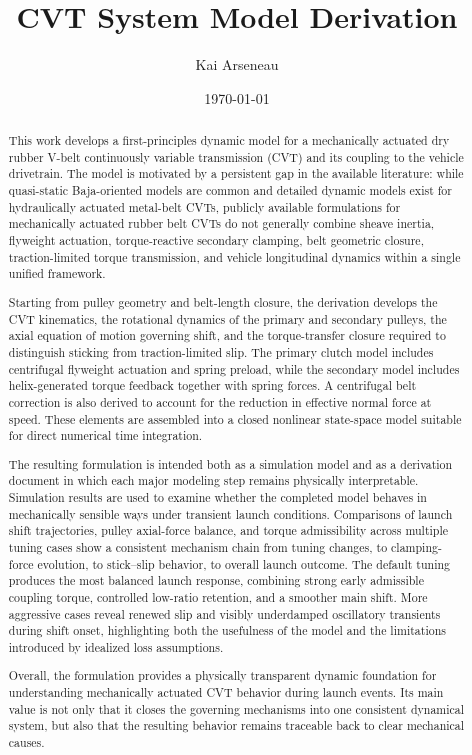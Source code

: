 \documentclass[11pt]{article}
\title{CVT System Model Derivation}
\author{Kai Arseneau}
\date{\today}
\numberwithin{equation}{section}
\newcounter{assump}
\begin{document}
\maketitle
\thispagestyle{empty}

\begin{abstract}
This work develops a first-principles dynamic model for a mechanically
actuated dry rubber V-belt continuously variable transmission (CVT) and its
coupling to the vehicle drivetrain. The model is motivated by a persistent gap
in the available literature: while quasi-static Baja-oriented models are common
and detailed dynamic models exist for hydraulically actuated metal-belt CVTs,
publicly available formulations for mechanically actuated rubber belt CVTs do
not generally combine sheave inertia, flyweight actuation, torque-reactive
secondary clamping, belt geometric closure, traction-limited torque
transmission, and vehicle longitudinal dynamics within a single unified
framework.

Starting from pulley geometry and belt-length closure, the derivation develops
the CVT kinematics, the rotational dynamics of the primary and secondary
pulleys, the axial equation of motion governing shift, and the torque-transfer
closure required to distinguish sticking from traction-limited slip. The
primary clutch model includes centrifugal flyweight actuation and spring
preload, while the secondary model includes helix-generated torque feedback
together with spring forces. A centrifugal belt correction is also derived to
account for the reduction in effective normal force at speed. These elements
are assembled into a closed nonlinear state-space model suitable for direct
numerical time integration.

The resulting formulation is intended both as a simulation model and as a
derivation document in which each major modeling step remains physically
interpretable. Simulation results are used to examine whether the completed
model behaves in mechanically sensible ways under transient launch conditions.
Comparisons of launch shift trajectories, pulley axial-force balance, and
torque admissibility across multiple tuning cases show a consistent mechanism
chain from tuning changes, to clamping-force evolution, to stick--slip
behavior, to overall launch outcome. The default tuning produces the most
balanced launch response, combining strong early admissible coupling torque,
controlled low-ratio retention, and a smoother main shift. More aggressive
cases reveal renewed slip and visibly underdamped oscillatory transients during
shift onset, highlighting both the usefulness of the model and the limitations
introduced by idealized loss assumptions.

Overall, the formulation provides a physically transparent dynamic foundation
for understanding mechanically actuated CVT behavior during launch events. Its
main value is not only that it closes the governing mechanisms into one
consistent dynamical system, but also that the resulting behavior remains
traceable back to clear mechanical causes.
\end{abstract}
\end{document}
